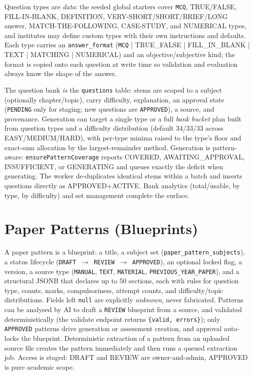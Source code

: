 Question types are \emph{data}: the seeded global starters cover
\texttt{MCQ}, TRUE/FALSE, FILL-IN-BLANK, DEFINITION, VERY-SHORT/SHORT/BRIEF/LONG
answer, MATCH-THE-FOLLOWING, CASE-STUDY, and NUMERICAL types, and institutes
may define custom types with their own instructions and defaults. Each type
carries an \texttt{answer\_format} (\texttt{MCQ} | TRUE\_FALSE | FILL\_IN\_BLANK |
TEXT | MATCHING | NUMERICAL) and an objective/subjective kind; the format is
copied onto each question at write time so validation and evaluation always
know the shape of the answer.

The question bank \emph{is} the \texttt{questions} table: stems are scoped to a
subject (optionally chapter/topic), carry difficulty, explanation, an
approval state (\texttt{PENDING} only for staging; new questions are
\texttt{APPROVED}), a source, and provenance. Generation can target a single
type or a full \emph{bank bucket} plan built from question types and a
difficulty distribution (default 34/33/33 across EASY/MEDIUM/HARD), with
per-type minima raised to the type's floor and exact-sum allocation by the
largest-remainder method. Generation is pattern-aware: \texttt{ensurePatternCoverage}
reports COVERED, AWAITING\_APPROVAL, INSUFFICIENT, or GENERATING and queues
exactly the deficit when generating. The worker de-duplicates identical stems
within a batch and inserts questions directly as APPROVED+ACTIVE. Bank
analytics (total/usable, by type, by difficulty) and set management complete
the surface.

\section{Paper Patterns (Blueprints)}

A paper pattern is a blueprint: a title, a subject set
(\texttt{paper\_pattern\_subjects}), a status lifecycle
(\texttt{DRAFT $\rightarrow$ REVIEW $\rightarrow$ APPROVED}), an optional
locked flag, a version, a source type (\texttt{MANUAL}, \texttt{TEXT},
\texttt{MATERIAL}, \texttt{PREVIOUS\_YEAR\_PAPER}), and a structural JSONB that
declares up to 50 sections, each with rules for question type, counts, marks,
compulsoriness, attempt counts, and difficulty/topic distributions. Fields
left \texttt{null} are explicitly \emph{unknown}, never fabricated. Patterns
can be analysed by AI to draft a \texttt{REVIEW} blueprint from a source, and
validated deterministically (the validate endpoint returns
\texttt{\{valid, errors\}}); only \texttt{APPROVED} patterns drive generation
or assessment creation, and approval auto-locks the blueprint. Deterministic
extraction of a pattern from an uploaded source file creates the pattern
immediately and then runs a queued extraction job. Access is staged: DRAFT and
REVIEW are owner-and-admin, APPROVED is pure academic scope.

